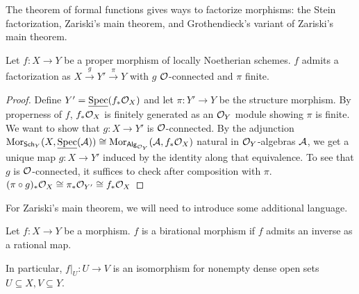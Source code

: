 The theorem of formal functions gives ways to factorize morphisms: the Stein factorization, Zariski's main theorem, and Grothendieck's variant of Zariski's main theorem. 
\begin{theorem}\label{thm: Stein factorization}
    Let $f:X\to Y$ be a proper morphism of locally Noetherian schemes. $f$ admits a factorization as $X\xrightarrow{g}Y'\xrightarrow{\pi}Y$ with $g$ $\mathcal{O}$-connected and $\pi$ finite. 
\end{theorem}
\begin{proof}
    Define $Y'=\underline{\operatorname{Spec}}(f_{*}\mathcal{O}_{X})$ and let $\pi:Y'\to Y$ be the structure morphism. By properness of $f$, $f_{*}\mathcal{O}_{X}$ is finitely generated as an $\mathcal{O}_{Y}$ module showing $\pi$ is finite. We want to show that $g:X\to Y'$ is $\mathcal{O}$-connected. By the adjunction $\mathrm{Mor}_{\mathsf{Sch}_{Y}}(X,\underline{\operatorname{Spec}}(\mathcal{A}))\cong\mathrm{Mor}_{\mathsf{Alg}_{\mathcal{O}_{Y}}}(\mathcal{A},f_{*}\mathcal{O}_{X})$ natural in $\mathcal{O}_{Y}$-algebras $\mathcal{A}$, we get a unique map $g:X\to Y'$ induced by the identity along that equivalence. To see that $g$ is $\mathcal{O}$-connected, it suffices to check after composition with $\pi$. $(\pi\circ g)_{*}\mathcal{O}_{X}\cong\pi_{*}\mathcal{O}_{Y'}\cong f_{*}\mathcal{O}_{X}$
\end{proof}
For Zariski's main theorem, we will need to introduce some additional language. 
\begin{definition}\label{def: birational morphism}
    Let $f:X\to Y$ be a morphism. $f$ is a birational morphism if $f$ admits an inverse as a rational map. 
\end{definition}
In particular, $f|_{U}:U\to V$ is an isomorphism for nonempty dense open sets $U\subseteq X,V\subseteq Y$. 


